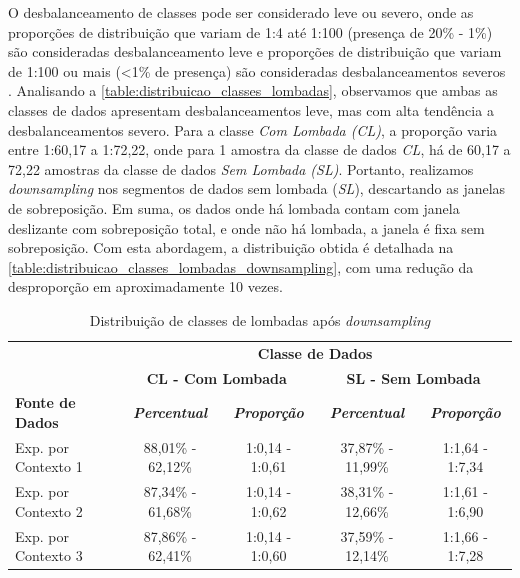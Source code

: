 O desbalanceamento de classes pode ser considerado leve ou severo, onde as proporções de distribuição que variam de 1:4 até 1:100 (presença de 20\% - 1\%) são consideradas desbalanceamento leve e proporções de distribuição que variam de 1:100 ou mais (<1\% de presença) são consideradas desbalanceamentos severos \cite{Krawczyk2016,Brownlee2020}. Analisando a \autoref{table:distribuicao_classes_lombadas}, observamos que ambas as classes de dados apresentam desbalanceamentos leve, mas com alta tendência a desbalanceamentos severo. Para a classe \emph{Com Lombada (CL)}, a proporção varia entre 1:60,17 a 1:72,22, onde para 1 amostra da classe de dados \emph{CL}, há de 60,17 a 72,22 amostras da classe de dados \emph{Sem Lombada (SL)}. Portanto, realizamos \textit{downsampling} nos segmentos de dados sem lombada (\emph{SL}), descartando as janelas de sobreposição. Em suma, os dados onde há lombada contam com janela deslizante com sobreposição total, e onde não há lombada, a janela é fixa sem sobreposição. Com esta abordagem, a distribuição obtida é detalhada na \autoref{table:distribuicao_classes_lombadas_downsampling}, com uma redução da desproporção em aproximadamente 10 vezes.

\begin{table}[h]
\caption{Distribuição de classes de lombadas após \textit{downsampling}}
\label{table:distribuicao_classes_lombadas_downsampling}
\centering
\scriptsize
\begin{tabular}{lcccc}
\cmidrule(l){2-5}
\multicolumn{1}{c}{\multirow{2}{*}{\textbf{}}} & 
\multicolumn{4}{c}{\textbf{Classe de Dados}} \\ \cmidrule(l){2-5} 
\multicolumn{1}{c}{} & 
\multicolumn{2}{c}{\textbf{CL - Com Lombada}} & 
\multicolumn{2}{c}{\textbf{SL - Sem Lombada}} \\ \midrule
\textbf{Fonte de Dados} & 
\textit{\textbf{Percentual}} & 
\textit{\textbf{Proporção}} & 
\textit{\textbf{Percentual}} & 
\textit{\textbf{Proporção}} \\ \midrule
Exp. por Contexto 1 & 88,01\% - 62,12\% & 1:0,14 - 1:0,61 & 37,87\% - 11,99\% & 1:1,64 - 1:7,34 \\ \midrule
Exp. por Contexto 2 & 87,34\% - 61,68\% & 1:0,14 - 1:0,62 & 38,31\% - 12,66\% & 1:1,61 - 1:6,90 \\ \midrule
Exp. por Contexto 3 & 87,86\% - 62,41\% & 1:0,14 - 1:0,60 & 37,59\% - 12,14\% & 1:1,66 - 1:7,28 \\ \bottomrule
\end{tabular}
\end{table}

